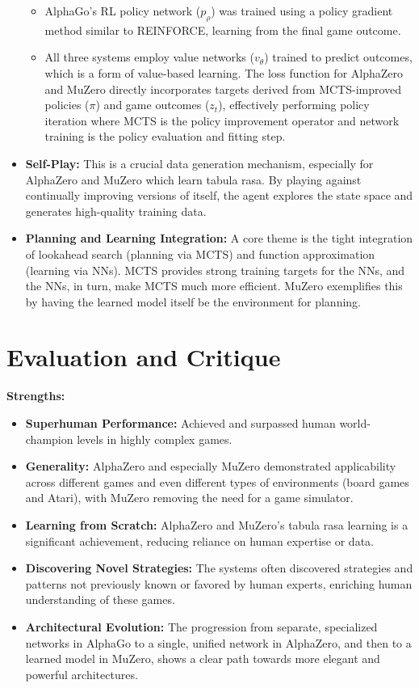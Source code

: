 \documentclass[11pt,a4paper]{article}
\begin{document}
\begin{itemize}
        \begin{itemize}
            \item AlphaGo's RL policy network ($p_{\rho}$) was trained using a policy gradient method similar to REINFORCE, learning from the final game outcome.
            \item All three systems employ value networks ($v_{\theta}$) trained to predict outcomes, which is a form of value-based learning. The loss function for AlphaZero and MuZero directly incorporates targets derived from MCTS-improved policies ($\pi$) and game outcomes ($z_t$), effectively performing policy iteration where MCTS is the policy improvement operator and network training is the policy evaluation and fitting step.
        \end{itemize}
    \item \textbf{Self-Play:} This is a crucial data generation mechanism, especially for AlphaZero and MuZero which learn tabula rasa. By playing against continually improving versions of itself, the agent explores the state space and generates high-quality training data.
    \item \textbf{Planning and Learning Integration:} A core theme is the tight integration of lookahead search (planning via MCTS) and function approximation (learning via NNs). MCTS provides strong training targets for the NNs, and the NNs, in turn, make MCTS much more efficient. MuZero exemplifies this by having the learned model itself be the environment for planning.
\end{itemize}

\section{Evaluation and Critique}

\textbf{Strengths:}
\begin{itemize}
    \item \textbf{Superhuman Performance:} Achieved and surpassed human world-champion levels in highly complex games.
    \item \textbf{Generality:} AlphaZero and especially MuZero demonstrated applicability across different games and even different types of environments (board games and Atari), with MuZero removing the need for a game simulator.
    \item \textbf{Learning from Scratch:} AlphaZero and MuZero's tabula rasa learning is a significant achievement, reducing reliance on human expertise or data.
    \item \textbf{Discovering Novel Strategies:} The systems often discovered strategies and patterns not previously known or favored by human experts, enriching human understanding of these games.
    \item \textbf{Architectural Evolution:} The progression from separate, specialized networks in AlphaGo to a single, unified network in AlphaZero, and then to a learned model in MuZero, shows a clear path towards more elegant and powerful architectures.
\end{itemize}
\end{document}
